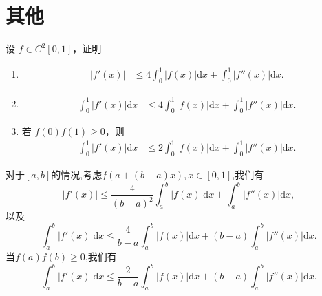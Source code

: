 \documentclass[../../main.tex]{subfiles}
\begin{document}
\section{其他}

\begin{example}
设 \( f \in C^2[0,1] \)，证明
\begin{enumerate}[(1)]
\item 
\begin{align}
|f'(x)| &\leqslant 4\int_0^1 |f(x)| \mathrm{d}x + \int_0^1 |f''(x)| \mathrm{d}x. \label{eq::::::::::::::7151--------------5}
\end{align}

\item 
\begin{align}
\int_0^1 |f'(x)| \mathrm{d}x &\leqslant 4\int_0^1 |f(x)| \mathrm{d}x + \int_0^1 |f''(x)| \mathrm{d}x .\label{eq::::::::::::::7151--------------6}
\end{align}

\item  若 \( f(0)f(1) \geqslant 0 \)，则
\begin{align}
\int_0^1 |f'(x)| \mathrm{d}x &\leqslant 2\int_0^1 |f(x)| \mathrm{d}x + \int_0^1 |f''(x)| \mathrm{d}x. \label{eq::::::::::::::7151--------------7}
\end{align}
\end{enumerate}
\end{example}
\begin{note}
对于$[a,b]$的情况,考虑$f(a+(b-a)x),x\in[0,1]$,我们有
\[
|f'(x)|\leqslant \frac{4}{(b-a)^2}\int_a^b|f(x)|\mathrm{d}x+\int_a^b|f''(x)|\mathrm{d}x,
\]
以及
\[
\int_a^b|f'(x)|\mathrm{d}x\leqslant \frac{4}{b-a}\int_a^b|f(x)|\mathrm{d}x+(b-a)\int_a^b|f''(x)|\mathrm{d}x.
\]
当$f(a)f(b)\geqslant 0$,我们有
\[
\int_a^b|f'(x)|\mathrm{d}x\leqslant \frac{2}{b-a}\int_a^b|f(x)|\mathrm{d}x+(b-a)\int_a^b|f''(x)|\mathrm{d}x.
\]
\end{note}
\end{document}
